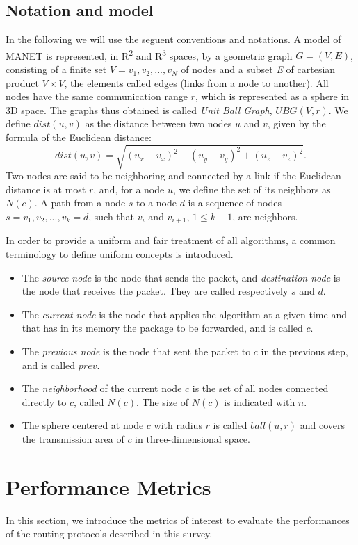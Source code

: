 \documentclass[journal,comsoc]{IEEEtran}
\begin{document}
\subsection{Notation and model}
In the following we will use the seguent conventions and notations. A model of MANET is represented, in R\textsuperscript{2} and R\textsuperscript{3} spaces, by a geometric graph \(G = (V, E)\), consisting of a finite set \(V = v_{1}, v_{2}, ..., v_{N}\) of nodes and a subset \emph{E} of cartesian product \(V \times V\), the elements called edges (links from a node to another). All nodes have the same communication range \(r\), which is represented as a sphere in 3D space. The graphs thus obtained is called \emph{Unit Ball Graph}, \(UBG(V, r)\). We define \(dist(u,v)\) as the distance between two nodes \(u\) and \(v\), given by the formula of the Euclidean distance:
  \[dist(u, v)=\sqrt{(u_x - v_x)^2+(u_y - v_y)^2+(u_z - v_z)^2}.\] 
  Two nodes are said to be neighboring and connected by a link if the Euclidean distance is at most \(r\), and, for a node \(u\), we define the set of its neighbors as \(N(c)\). A path from a node \(s\) to a node \(d\) is a sequence of nodes \(s = v_{1}, v_{2}, ..., v_{k} = d\), such that \(v_{i}\) and \(v_{i+1}\), \(1 \leq k-1\), are neighbors.
\par In order to provide a uniform and fair treatment of all algorithms, a common terminology to define uniform concepts is introduced.
\begin{itemize}
\item The \emph{source node} is the node that sends the packet, and \emph{destination node} is the node that receives the packet. They are called respectively \(s\) and \(d\).
\item The \emph{current node} is the node that applies the algorithm at a given time and that has in its memory the package to be forwarded, and is called \(c\).
\item The \emph{previous node} is the node that sent the packet to \(c\) in the previous step, and is called \(prev\).
\item The \emph{neighborhood} of the current node \(c\) is the set of all nodes connected directly to \(c\), called \(N(c)\). The size of \(N(c)\) is indicated with \(n\).
\item The sphere centered at node \(c\) with radius \(r\) is called \(ball(u,r)\) and covers the transmission area of \(c\) in three-dimensional space.
\end{itemize}

\section{Performance Metrics}
In this section, we introduce the metrics of interest to evaluate the performances of the routing protocols described in this survey.
\end{document}
